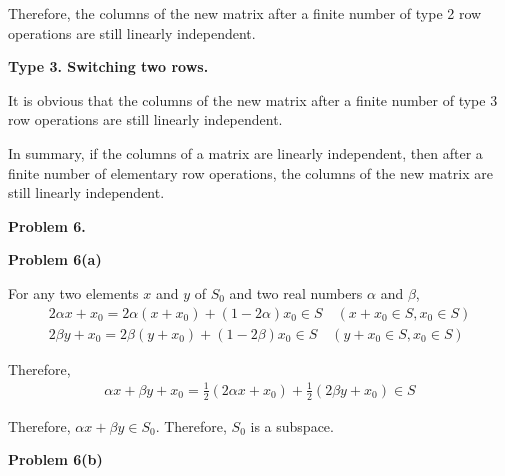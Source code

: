 \documentclass[12pt]{article}
\begin{document}
Therefore, the columns of the new matrix after a finite number of type 2 row operations are still linearly independent.

\vspace{\baselineskip}
\textbf{Type 3. Switching two rows.}

It is obvious that the columns of the new matrix after a finite number of type 3 row operations are still linearly independent.

\vspace{\baselineskip}
In summary, if the columns of a matrix are linearly independent, then after a finite number of elementary row operations, the columns of the new matrix are still linearly independent.

\vspace{\baselineskip}
\noindent
\textbf{Problem 6.}

\textbf{Problem 6(a)}

For any two elements $x$ and $y$ of $S_0$ and two real numbers $\alpha$ and $\beta$,
\begin{gather*}
    2 \alpha x+x_0 = 2\alpha(x+x_0) + (1-2\alpha) x_0 \in S \quad(x+x_0  \in S, x_0 \in S) \\
    2 \beta y+x_0 = 2\beta(y+x_0) + (1-2\beta) x_0 \in S \quad(y+x_0  \in S, x_0 \in S)
\end{gather*}

Therefore,
\begin{gather*}
    \alpha x + \beta y + x_0 = \frac{1}{2}(2 \alpha x+x_0) + \frac{1}{2} (2 \beta y+x_0) \in S
\end{gather*}

Therefore, $\alpha x+ \beta y \in S_0$. Therefore, $S_0$ is a subspace.

\vspace{\baselineskip}
\textbf{Problem 6(b)}
\end{document}
